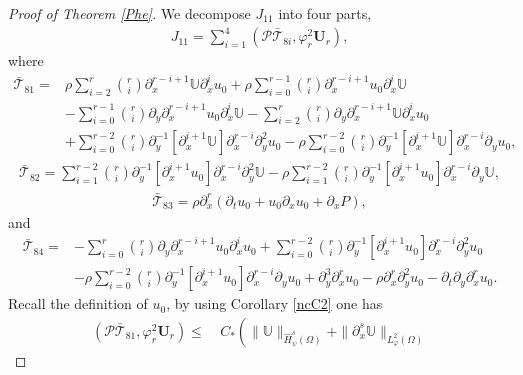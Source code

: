 \documentclass{amsart}
\numberwithin{equation}{section}
\begin{document}
\begin{proof}[Proof of Theorem \ref{Phe}]
We decompose $J_{11}$ into four parts,
\begin{align}\label{J11}
J_{11}
=\sum_{i=1}^{4}(\mathcal{P}\bar{\mathcal{T}}_{8i},\varphi_{r}^{2}\mathbf{U}_{r}),
\end{align}
where
\begin{align*}
\bar{\mathcal{T}}_{81}
=& \rho\sum_{i=2}^{r}\binom{r}{i}\partial_{x}^{r-i+1}\mathbb{U}\partial_{x}^{i}u_{0}
  +\rho\sum_{i=0}^{r-1}\binom{r}{i}\partial_{x}^{r-i+1}u_{0}\partial_{x}^{i}\mathbb{U}\\
 &-\sum_{i=0}^{r-1}\binom{r}{i}\partial_{y}\partial_{x}^{r-i+1}u_{0}\partial_{x}^{i}\mathbb{U}
  -\sum_{i=2}^{r}\binom{r}{i}\partial_{y}\partial_{x}^{r-i+1}\mathbb{U}\partial_{x}^{i}u_{0}\\
 &+\sum_{i=0}^{r-2}\binom{r}{i}\partial_{y}^{-1}[\partial_{x}^{i+1}\mathbb{U}]\partial_{x}^{r-i}\partial_{y}^{2}u_{0}
  -\rho\sum_{i=0}^{r-2}\binom{r}{i}\partial_{y}^{-1}[\partial_{x}^{i+1}\mathbb{U}]\partial_{x}^{r-i}\partial_{y}u_{0},
\end{align*}
\begin{align*}
\bar{\mathcal{T}}_{82}
= \sum_{i=1}^{r-2}\binom{r}{i}\partial_{y}^{-1}[\partial_{x}^{i+1}u_{0}]\partial_{x}^{r-i}\partial_{y}^{2}\mathbb{U}
  -\rho\sum_{i=1}^{r-2}\binom{r}{i}\partial_{y}^{-1}[\partial_{x}^{i+1}u_{0}]\partial_{x}^{r-i}\partial_{y}\mathbb{U},
\end{align*}
\begin{align*}
\bar{\mathcal{T}}_{83}
=\rho\partial_{x}^{r}(\partial_{t}u_{0}+u_{0}\partial_{x}u_{0}+\partial_{x}P),
\end{align*}
and
\begin{align*}
\bar{\mathcal{T}}_{84}
=&-\sum_{i=0}^{r}\binom{r}{i}\partial_{y}\partial_{x}^{r-i+1}u_{0}\partial_{x}^{i}u_{0}
  +\sum_{i=0}^{r-2}\binom{r}{i}\partial_{y}^{-1}[\partial_{x}^{i+1}u_{0}]\partial_{x}^{r-i}\partial_{y}^{2}u_{0}\\
 &-\rho\sum_{i=0}^{r-2}\binom{r}{i}\partial_{y}^{-1}[\partial_{x}^{i+1}u_{0}]\partial_{x}^{r-i}\partial_{y}u_{0}
  +\partial_{y}^{3}\partial_{x}^{r}u_{0}
  -\rho\partial_{x}^{r}\partial_{y}^{2}u_{0}
  -\partial_{t}\partial_{y}\partial_{x}^{r}u_{0}.
\end{align*}
Recall the definition of $u_{0}$, by using Corollary \ref{ncC2} one has
\begin{align}\label{J111}
(\mathcal{P}\bar{\mathcal{T}}_{81},\varphi_{r}^{2}\mathbf{U}_{r})
\leq&~C_{*}\left(\|\mathbb{U}\|_{\hat{H}_{\psi}^{s}(\Omega)}+\|\partial_{x}^{s}\mathbb{U}\|_{L_{\varphi}^{2}(\Omega)}

\end{align}
\end{proof}
\end{document}
